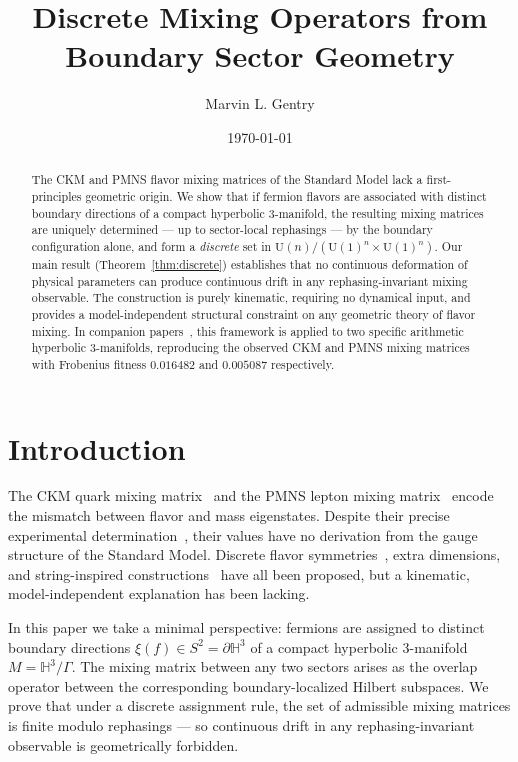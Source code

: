 \documentclass[11pt,a4paper]{article}
\theoremstyle{definition}
\theoremstyle{remark}
\begin{document}
\title{Discrete Mixing Operators from Boundary Sector Geometry}

\author[1]{Marvin L. Gentry}
\date{\today}

\begin{abstract}
The CKM and PMNS flavor mixing matrices of the Standard Model
lack a first-principles geometric origin.
We show that if fermion flavors are associated with distinct boundary
directions of a compact hyperbolic 3-manifold, the resulting mixing
matrices are uniquely determined --- up to sector-local rephasings ---
by the boundary configuration alone, and form a \emph{discrete} set
in $\mathrm{U}(n)/(\mathrm{U}(1)^n\times\mathrm{U}(1)^n)$.
Our main result (Theorem~\ref{thm:discrete}) establishes that no
continuous deformation of physical parameters can produce continuous
drift in any rephasing-invariant mixing observable.
The construction is purely kinematic, requiring no dynamical input,
and provides a model-independent structural constraint on any geometric
theory of flavor mixing.
In companion papers~\cite{Gentry:CKM,Gentry:PMNS}, this framework
is applied to two specific arithmetic hyperbolic 3-manifolds,
reproducing the observed CKM and PMNS mixing matrices with
Frobenius fitness $0.016482$ and $0.005087$ respectively.
\end{abstract}

\maketitle

\section{Introduction}

The CKM quark mixing matrix~\cite{Cabibbo,KM} and the PMNS lepton
mixing matrix~\cite{Maki,Pontecorvo} encode the mismatch between
flavor and mass eigenstates. Despite their precise experimental
determination~\cite{PDG2024}, their values have no derivation from
the gauge structure of the Standard Model. Discrete flavor
symmetries~\cite{AltarelliFeruglio}, extra dimensions, and
string-inspired constructions~\cite{KingLuhn} have all been proposed,
but a kinematic, model-independent explanation has been lacking.

In this paper we take a minimal perspective: fermions are assigned
to distinct boundary directions $\xi(f)\in S^2=\partial\mathbb{H}^3$
of a compact hyperbolic 3-manifold $M=\mathbb{H}^3/\Gamma$.
The mixing matrix between any two sectors arises as the overlap
operator between the corresponding boundary-localized Hilbert
subspaces. We prove that under a discrete assignment rule, the set
of admissible mixing matrices is finite modulo rephasings ---
so continuous drift in any rephasing-invariant observable is
geometrically forbidden.
\end{document}
